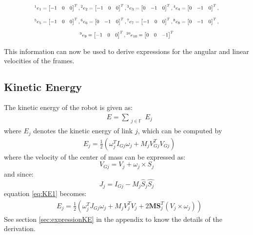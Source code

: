 \documentclass[a4paper,10pt]{article}
\newcommand\scalemath[2]{\scalebox{#1}{\mbox{\ensuremath{\displaystyle #2}}}}
\begin{document}
\[
\scalemath{0.75}{{}^1e_1 = \left[\begin{matrix}-1 & 0 & 0\end{matrix}\right]^T, 
{}^2e_2 = \left[\begin{matrix}-1 & 0 & 0\end{matrix}\right]^T, 
{}^3e_3 = \left[\begin{matrix}0 & -1 & 0\end{matrix}\right]^T, 
{}^4e_4 = \left[\begin{matrix}0 & -1 & 0\end{matrix}\right]^T,}
\]
\[
\scalemath{0.75}{{}^5e_5 = \left[\begin{matrix}-1 & 0 & 0\end{matrix}\right]^T, 
{}^6e_6 = \left[\begin{matrix}0 & -1 & 0\end{matrix}\right]^T, 
{}^7e_7 = \left[\begin{matrix}-1 & 0 & 0\end{matrix}\right]^T, 
{}^8e_8 = \left[\begin{matrix}0 & -1 & 0\end{matrix}\right]^T,}
\]
\[
\scalemath{0.75}{{}^9e_9 = \left[\begin{matrix}-1 & 0 & 0\end{matrix}\right]^T, 
{}^{10}e_{10} = \left[\begin{matrix}0 & 0 & -1\end{matrix}\right]^T}
\]

This information can now be used to derive expressions for the angular and linear velocities of the frames.


\subsection{Kinetic Energy}
The kinetic energy of the robot is given as:
\begin{align}
 &E = \sum_{\substack{j \in \mathbb{F}}} E_j
\end{align}where $E_j$ denotes the kinetic energy of link $j$, which can be computed by
\begin{align}
 &E_j = \frac{1}{2}(\omega_j^TI_{Gj}\omega_j+M_jV_{Gj}^TV_{Gj}) \label{eq:KE1}
\end{align} where the velocity of the center of mass can be expressed as:
\[
 V_{Gj} = V_j + \omega_j \times S_j
\] and since:
\[
 J_j = I_{Gj} - M_j \hat{S}_j \hat{S_j}
\] equation \ref{eq:KE1} becomes:
\begin{align}
 &E_j = \frac{1}{2}(\omega_j^TJ_{Gj}\omega_j+M_jV_j^TV_j + 2\mathbf{MS}_j^T(V_j \times \omega_j)) \label{eq:KE2}
\end{align} See section \ref{sec:expressionKE} in the appendix to know the details of the derivation.
\end{document}
